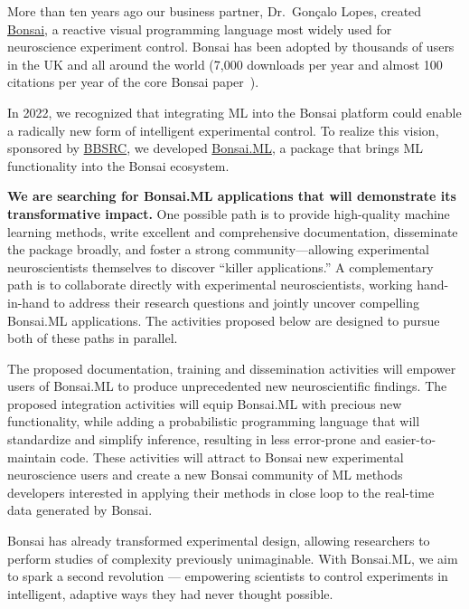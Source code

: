 More than ten years ago our business partner, Dr.~Gonçalo Lopes, created
\href{https://bonsai-rx.org/}{Bonsai}, a reactive visual programming
language most widely used for neuroscience experiment control.
%
Bonsai has been adopted by thousands of users in the UK and all around the
world (7,000 downloads per year and almost 100 citations per year of the core Bonsai
paper~\citep{lopesEtAl15}).

In 2022, we recognized that integrating ML into the Bonsai platform could
enable a radically new form of intelligent experimental control.
%
To realize this vision, sponsored by
\href{https://gow.bbsrc.ukri.org/grants/AwardDetails.aspx?FundingReference=BB\%2FW019132\%2F1}{BBSRC},
we developed \href{https://bonsai-rx.org/machinelearning}{Bonsai.ML}, a package
that brings ML functionality into the Bonsai ecosystem.

\textbf{We are searching for Bonsai.ML applications that will demonstrate its
transformative impact.}
%
One possible path is to provide high-quality machine learning methods, write
excellent and comprehensive documentation, disseminate the package broadly, and
foster a strong community—allowing experimental neuroscientists themselves to
discover “killer applications.”
%
A complementary path is to collaborate directly with experimental
neuroscientists, working hand-in-hand to address their research questions and
jointly uncover compelling Bonsai.ML applications.
%
The activities proposed below are designed to pursue both of these paths in
parallel.

The proposed documentation, training and dissemination activities will empower
users of Bonsai.ML to produce unprecedented new neuroscientific findings. The
proposed integration activities will equip Bonsai.ML with precious new
functionality, while adding a probabilistic programming language that will
standardize and simplify inference, resulting in less error-prone and
easier-to-maintain code.
%
These activities will attract to Bonsai new experimental neuroscience users and
create a new Bonsai community of ML methods developers interested in applying
their methods in close loop to the real-time data generated by Bonsai.

Bonsai has already transformed experimental design, allowing researchers to
perform studies of complexity previously unimaginable. With Bonsai.ML, we aim
to spark a second revolution — empowering scientists to control experiments in
intelligent, adaptive ways they had never thought possible.
